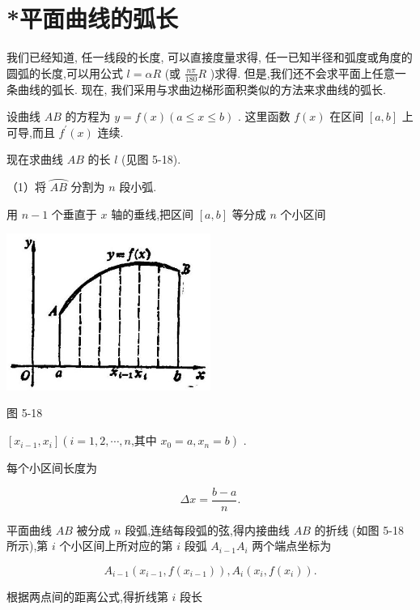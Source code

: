 \documentclass[lang=cn,newtx,10pt,scheme=chinese]{elegantbook}
\begin{document}
\section{*平面曲线的弧长}

我们已经知道, 任一线段的长度, 可以直接度量求得, 任一已知半径和弧度或角度的圆弧的长度,可以用公式 \(l = {\alpha R}\) (或 \(\frac{n\pi }{180}R\) )求得. 但是,我们还不会求平面上任意一条曲线的弧长. 现在, 我们采用与求曲边梯形面积类似的方法来求曲线的弧长.

设曲线 \({AB}\) 的方程为 \(y = f\left( x\right) \left( {a \leq x \leq b}\right)\) . 这里函数 \(f\left( x\right)\) 在区间 \(\left\lbrack {a,b}\right\rbrack\) 上可导,而且 \({f}^{\prime }\left( x\right)\) 连续.

现在求曲线 \({AB}\) 的长 \(l\) (见图 5-18).

（1）将 \(\overset{⏜}{AB}\) 分割为 \(n\) 段小弧.

用 \(n - 1\) 个垂直于 \(x\) 轴的垂线,把区间 \(\left\lbrack {a,b}\right\rbrack\) 等分成 \(n\) 个小区间

\begin{center}
\includegraphics[max width=0.5\textwidth]{images/01912c18-5c3f-733d-b775-749ba9897a9d_240_926911.jpg}
\end{center}

图 5-18

\(\left\lbrack {{x}_{i - 1},{x}_{i}}\right\rbrack \left( {i = 1,2,\cdots ,n\text{,其中 }{x}_{0} = a,{x}_{n} = b}\right)\) .

每个小区间长度为

\[
{\Delta x} = \frac{b - a}{n}.
\]

平面曲线 \({AB}\) 被分成 \(n\) 段弧,连结每段弧的弦,得内接曲线 \({AB}\) 的折线 (如图 5-18 所示),第 \(i\) 个小区间上所对应的第 \(i\) 段弧 \({A}_{i - 1}{A}_{i}\) 两个端点坐标为

\[
{A}_{i - 1}\left( {{x}_{i - 1},f\left( {x}_{i - 1}\right) }\right) ,{A}_{i}\left( {{x}_{i},f\left( {x}_{i}\right) }\right) .
\]

根据两点间的距离公式,得折线第 \(i\) 段长
\end{document}
